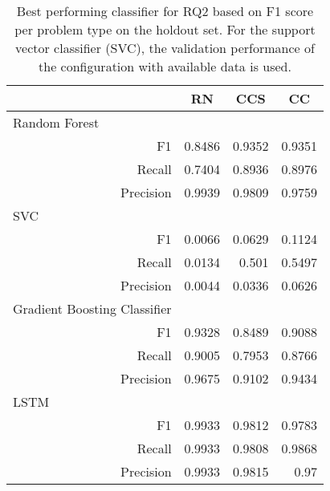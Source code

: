 \begin{table}[t]
    \centering
    \begin{tabular}{rrrr}
    \toprule
    \multicolumn{1}{l}{}                             & \multicolumn{1}{c}{RN}         & \multicolumn{1}{c}{CCS} & \multicolumn{1}{c}{CC} \\ \midrule
    \multicolumn{1}{l}{Random Forest}                &  &            &              \\
    F1                                               & 0.8486               & 0.9352     & 0.9351       \\
    Recall                                           & 0.7404               & 0.8936     & 0.8976       \\
    Precision                                        & 0.9939               & 0.9809     & 0.9759       \\ \midrule
    \multicolumn{1}{l}{SVC}                          &                      &            &              \\
    F1                                               &   0.0066             &  0.0629    &   0.1124     \\
    Recall                                           &   0.0134             &  0.501    &   0.5497     \\
    Precision                                        &   0.0044             &  0.0336    &   0.0626      \\ \midrule
    \multicolumn{1}{l}{Gradient Boosting Classifier} &                      &            &              \\
    F1                                               & 0.9328               & 0.8489     & 0.9088       \\
    Recall                                           & 0.9005               & 0.7953     & 0.8766       \\
    Precision                                        & 0.9675               & 0.9102     & 0.9434       \\ \midrule
    \multicolumn{1}{l}{LSTM}                         &                      &            &              \\
    F1                                               & 0.9933               & 0.9812     & 0.9783       \\
    Recall                                           & 0.9933               & 0.9808     & 0.9868       \\
    Precision                                        & 0.9933               & 0.9815     & 0.97       \\ \bottomrule
    \end{tabular}
    \caption[Best performing classifiers for RQ2]{Best performing classifier for RQ2 based on F1 score per problem type on the holdout set. For the support vector classifier (SVC), the validation performance of the configuration with available data is used.}
    \label{tab:rq2_best_classifier}
    \end{table}